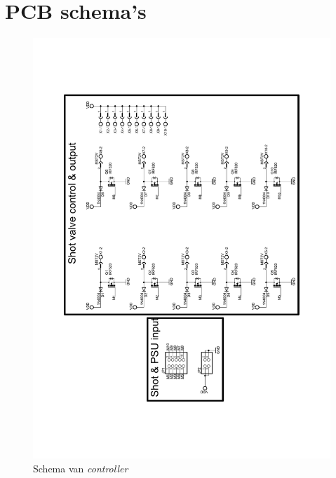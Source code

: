 \chapter{PCB schema's}
\label{app:schematics}

\begin{figure}
    \includegraphics[scale=0.5]{figures/controller_schematic.pdf}
    \caption{Schema van \emph{controller}}
\end{figure}

